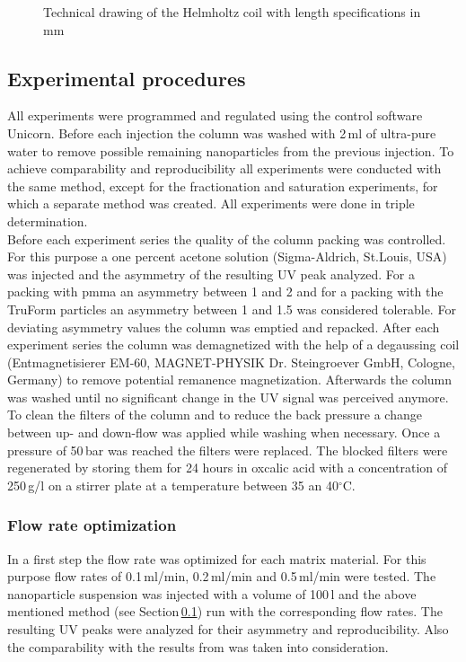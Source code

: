 \begin{figure}[H]
        \caption[Technical drawing of the Helmholtz coil]{Technical drawing of the Helmholtz coil with length specifications in mm }
        \label{fig:Helmholtz_coil}
  \end{figure}  

\subsection{Experimental procedures}
\label{subsec:Exp_Pro}
All experiments were programmed and regulated using the control software Unicorn. Before each injection the column was washed with 2\,ml of ultra-pure water to remove possible remaining nanoparticles from the previous injection. To achieve comparability and reproducibility all experiments were conducted with the same method, except for the fractionation and saturation experiments, for which a separate method was created. All experiments were done in triple determination. \\
Before each experiment series the quality of the column packing was controlled. For this purpose a one percent acetone solution (Sigma-Aldrich, St.Louis, USA) was injected and the asymmetry of the  resulting UV peak analyzed. For a packing with \gls{pmma} an asymmetry between 1 and 2 and for a packing with the TruForm particles an asymmetry between 1 and 1.5 was considered tolerable. For deviating asymmetry values the column was emptied and repacked. After each experiment series the column was demagnetized with the help of a degaussing coil (Entmagnetisierer EM-60, MAGNET-PHYSIK Dr. Steingroever GmbH, Cologne, Germany) to remove potential remanence magnetization. Afterwards the column was washed until no significant change in the UV signal was perceived anymore. To clean the filters of the column and to reduce the back pressure a change between up- and down-flow was applied while washing when necessary. Once a pressure of 50\,bar was reached the filters were replaced. The blocked filters were regenerated by storing them for 24 hours in oxcalic acid with a concentration of 250\,g/l on a stirrer plate at a temperature between 35 an 40$^\circ$C.\newpage

\subsubsection{Flow rate optimization}
\label{subsubsec:Flow_rate}
In a first step the flow rate was optimized for each matrix material. For this purpose flow rates of 0.1\,ml/min, 0.2\,ml/min and 0.5\,ml/min were tested. The nanoparticle suspension was injected with a volume of 100\,\textmu l and the above mentioned method (see Section\,\ref{subsec:Exp_Pro}) run with the corresponding flow rates. The resulting UV peaks were analyzed for their asymmetry and reproducibility. Also the comparability with the results from \cite{AndreMaster} was taken into consideration.  

